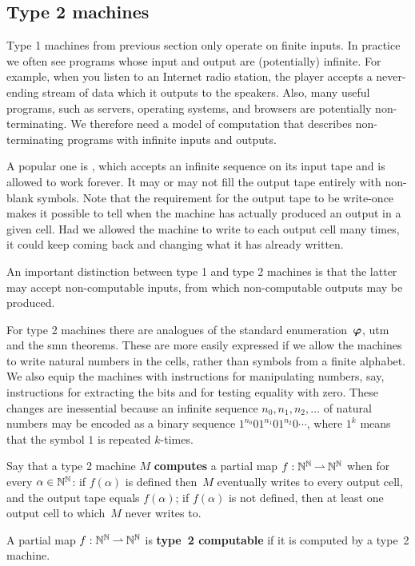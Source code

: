 \subsection{Type 2 machines}
\label{sec:type-2}

Type 1 machines from previous section only operate on finite inputs.
In practice we often see programs whose input and output are
(potentially) infinite. For example, when you listen to an Internet
radio station, the player accepts a never-ending stream of data which
it outputs to the speakers. Also, many useful programs, such as servers, operating systems, and browsers are potentially non-terminating. We therefore need a model of computation that describes non-terminating programs with infinite inputs and outputs.

A popular one is , which accepts an
infinite sequence on its input tape and is allowed to work forever. It
may or may not fill the output tape entirely with non-blank symbols.
Note that the requirement for the output tape to be write-once makes
it possible to tell when the machine has actually produced an output
in a given cell. Had we allowed the machine to write to each output
cell many times, it could keep coming back and changing what it has
already written.

An important distinction between type 1 and type 2 machines is that
the latter may accept non-computable inputs, from which non-computable
outputs may be produced.

For type 2 machines there are analogues of the standard
enumeration~$\text{\boldmath{$\varphi$}}$, utm and the smn theorems. These are more easily
expressed if we allow the machines to write natural numbers in the
cells, rather than symbols from a finite alphabet. We also equip the
machines with instructions for manipulating numbers, say, instructions
for extracting the bits and for testing equality with zero. These
changes are inessential because an infinite sequence $n_0, n_1, n_2,
\ldots$ of natural numbers may be encoded as a binary sequence
$1^{n_0}01^{n_1}01^{n_2}0\cdots$, where $1^k$ means that the symbol
$1$ is repeated $k$-times.

\begin{definition}
  Say that a type 2 machine $M$ \textbf{computes} a partial map $f : \mathbb{N}^{\mathbb{N}} \mathbin{\rightharpoonup}
  \mathbb{N}^{\mathbb{N}}$ when for every $\alpha \in \mathbb{N}^{\mathbb{N}}$:
  if $f(\alpha)$ is defined then~$M$ eventually writes to every output cell, and the output tape equals $f(\alpha)$; if $f(\alpha)$ is not defined, then at least one output cell to which~$M$ never writes to.

  A partial map $f : \mathbb{N}^{\mathbb{N}} \mathbin{\rightharpoonup} \mathbb{N}^{\mathbb{N}}$ is \textbf{type~2 computable} if it is computed by a type~2 machine.
\end{definition}


